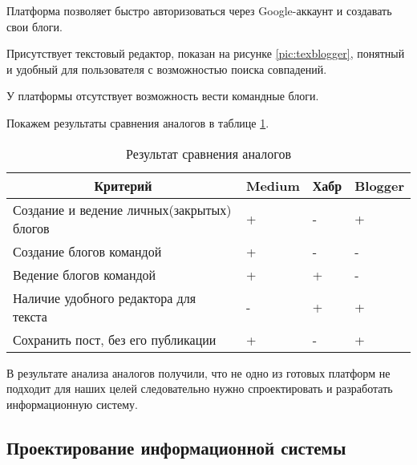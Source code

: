 Платформа позволяет быстро авторизоваться через Google-аккаунт и создавать свои блоги.

Присутствует текстовый редактор, показан на рисунке \ref{pic:texblogger}, понятный и удобный для пользователя с возможностью поиска совпадений.


У платформы отсутствует возможность вести командные блоги.

Покажем результаты сравнения аналогов в таблице \ref{tabular:analogi}.

\begin{table}[H]
	\caption{Результат сравнения аналогов}
	\label{tabular:analogi}
	\begin{center}
		\begin{tabular}{|l|l|l|l|}
			\hline
			\multicolumn{1}{|c|}{Критерий}             & \multicolumn{1}{c|}{Medium} & \multicolumn{1}{c|}{Хабр} & \multicolumn{1}{c|}{Blogger} \\ \hline
			Создание и ведение личных(закрытых) блогов & +                           & -                         & +                            \\ \hline
			Создание блогов командой                   & +                           & -                         & -                            \\ \hline
			Ведение блогов командой                    & +                           & +                         & -                            \\ \hline
			Наличие удобного редактора для текста      & -                           & +                         & +                            \\ \hline
			Сохранить пост, без его публикации         & +                           & -                         & +                            \\ \hline
		\end{tabular}
	\end{center}
\end{table}
В результате анализа аналогов получили, что не одно из готовых платформ не подходит для наших целей следовательно нужно спроектировать и разработать информационную систему.

\pagebreak

\subsection{Проектирование информационной системы}

